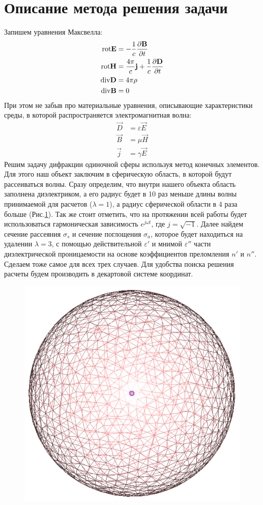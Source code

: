 \section{Описание метода решения задачи}
Запишем уравнения Максвелла:
\begin{align}
 {\rm rot}\vec{E} &= -\dfrac{1}{c}\dfrac{\partial \vec{B}}{\partial t} \\
 \rm rot\vec{H} &=\dfrac{4\pi}{c}\vec{j} + \dfrac{1}{c}\dfrac{\partial \vec{D}}{\partial t} \\
 \rm div\vec{D} &= 4\pi \rho \\
 \rm div\vec{B} &= 0 
\end{align}
При этом не забыв про материальные уравнения, описывающие характеристики среды, в которой распространяется электромагнитная волна:
\begin{align}
	   \vec{D} &= \varepsilon \vec{E}\\
	   \vec{B} &= \mu \vec{H} \\
	   \vec{j} &= \gamma \vec{E}
\end{align}
Решим задачу дифракции одиночной сферы используя метод конечных элементов. Для этого наш объект заключим в сферическую область, в которой будут рассеиваться волны. Сразу определим, что внутри нашего объекта область заполнена диэлектриком, а его радиус будет в 10 раз меньше длины волны принимаемой для расчетов ($ \lambda = 1 $), а радиус сферической области в 4 раза больше (Рис.\ref{fig:ces1}). Так же стоит отметить, что на протяжении всей работы будет использоваться гармоническая зависимость $ e^{j \omega t} $, где $ j = \sqrt{-1} $. Далее найдем сечение рассеяния $ \sigma_s $ и сечение поглощения $ \sigma_a $, которое будет находиться на удалении $ \lambda = 3 $, с помощью действительной $ \varepsilon' $ и мнимой $ \varepsilon'' $ части диэлектрической проницаемости на основе коэффициентов преломления $ n' $ и $ n'' $. Сделаем тоже самое для всех трех случаев.  Для удобства поиска решения расчеты будем производить в декартовой системе координат. \\
\begin{figure}[h!]
	\centering
	\includegraphics[width=0.4\linewidth]{ces1}
	\caption{}
	\label{fig:ces1}
\end{figure} \\
